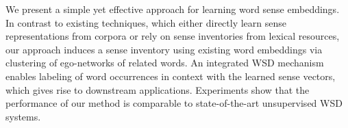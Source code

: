 We present a simple yet effective approach for learning word sense embeddings. In contrast to existing techniques, which either directly learn sense representations from corpora or rely on sense inventories from lexical resources, our approach induces a sense inventory using existing word embeddings via clustering of ego-networks of related words. An integrated WSD mechanism enables labeling of word occurrences in context with the learned sense vectors, which gives rise to downstream applications. Experiments show that the performance of our method is comparable to  state-of-the-art unsupervised WSD systems.
